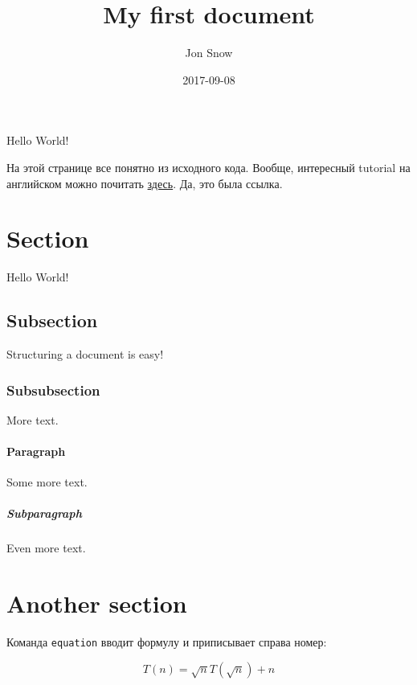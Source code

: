 \documentclass{article}
\title{My first document}
\date{2017-09-08}
\author{Jon Snow}
\begin{document}

  \maketitle %
  \newpage %

  Hello World!

  \newpage

На этой странице все понятно из исходного кода. Вообще, интересный tutorial на английском можно почитать \href{https://www.latex-tutorial.com/tutorials/}{здесь}. Да, это была ссылка.

\section{Section}

Hello World!

\subsection{Subsection}

Structuring a document is easy!

\subsubsection{Subsubsection}

More text.

\paragraph{Paragraph}

Some more text.

\subparagraph{Subparagraph}

Even more text.

\section{Another section}

\newpage

Команда \texttt{equation} вводит формулу и приписывает справа номер:

\begin{equation}
  T(n) = \sqrt{n} T(\sqrt{n}) + n
\end{equation}
\end{document}

